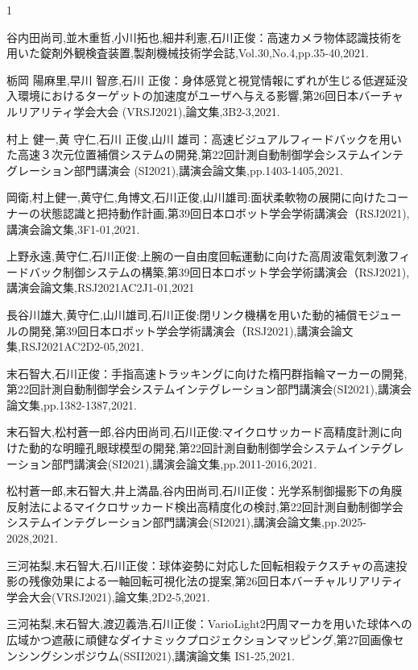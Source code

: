 \begin{発表}{1}

谷内田尚司,並木重哲,小川拓也,細井利憲,石川正俊：高速カメラ物体認識技術を用いた錠剤外観検査装置,製剤機械技術学会誌,Vol.30,No.4,pp.35-40,2021.

栃岡 陽麻里,早川 智彦,石川 正俊：身体感覚と視覚情報にずれが生じる低遅延没入環境におけるターゲットの加速度がユーザへ与える影響,第26回日本バーチャルリアリティ学会大会 (VRSJ2021),論文集,3B2-3,2021.

村上 健一,黄 守仁,石川 正俊,山川 雄司：高速ビジュアルフィードバックを用いた高速３次元位置補償システムの開発,第22回計測自動制御学会システムインテグレーション部門講演会 (SI2021),講演会論文集,pp.1403-1405,2021.

岡衛,村上健一,黄守仁,角博文,石川正俊,山川雄司:面状柔軟物の展開に向けたコーナーの状態認識と把持動作計画,第39回日本ロボット学会学術講演会（RSJ2021),講演会論文集,3F1-01,2021.

上野永遠,黄守仁,石川正俊:上腕の一自由度回転運動に向けた高周波電気刺激フィードバック制御システムの構築,第39回日本ロボット学会学術講演会（RSJ2021),講演会論文集,RSJ2021AC2J1-01,2021

長谷川雄大,黄守仁,山川雄司,石川正俊:閉リンク機構を用いた動的補償モジュールの開発,第39回日本ロボット学会学術講演会（RSJ2021),講演会論文集,RSJ2021AC2D2-05,2021.

末石智大,石川正俊：手指高速トラッキングに向けた楕円群指輪マーカーの開発,第22回計測自動制御学会システムインテグレーション部門講演会(SI2021),講演会論文集,pp.1382-1387,2021.

末石智大,松村蒼一郎,谷内田尚司,石川正俊:マイクロサッカード高精度計測に向けた動的な明瞳孔眼球模型の開発,第22回計測自動制御学会システムインテグレーション部門講演会(SI2021),講演会論文集,pp.2011-2016,2021.

松村蒼一郎,末石智大,井上満晶,谷内田尚司,石川正俊：光学系制御撮影下の角膜反射法によるマイクロサッカード検出高精度化の検討,第22回計測自動制御学会システムインテグレーション部門講演会(SI2021),講演会論文集,pp.2025-2028,2021.

三河祐梨,末石智大,石川正俊：球体姿勢に対応した回転相殺テクスチャの高速投影の残像効果による一軸回転可視化法の提案,第26回日本バーチャルリアリティ学会大会(VRSJ2021),論文集,2D2-5,2021.

三河祐梨,末石智大,渡辺義浩,石川正俊：VarioLight2円周マーカを用いた球体への広域かつ遮蔽に頑健なダイナミックプロジェクションマッピング,第27回画像センシングシンポジウム(SSII2021),講演論文集 IS1-25,2021.


\end{発表}
